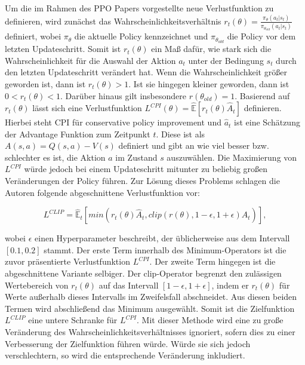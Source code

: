 Um die im Rahmen des PPO Papers vorgestellte neue Verlustfunktion zu definieren, wird zunächst das Wahrscheinlichkeitsverhältnis $r_t(\theta) = \frac{\pi_\theta(a_t|s_t)}{\pi_{\theta_{old}}(a_t|s_t)}$ definiert, wobei $\pi_\theta$ die aktuelle Policy kennzeichnet und $\pi_{\theta_{old}}$ die Policy vor dem letzten Updateschritt. Somit ist $r_t(\theta)$ ein Maß dafür, wie stark sich die Wahrscheinlichkeit für die Auswahl der Aktion $a_t$ unter der Bedingung $s_t$ durch den letzten Updateschritt verändert hat. Wenn die Wahrscheinlichkeit größer geworden ist, dann ist $r_t(\theta) > 1$. Ist sie hingegen kleiner geworden, dann ist $0 < r_t(\theta) < 1$. Darüber hinaus gilt insbesondere $r(\theta_{old}) = 1$. Basierend auf $r_t(\theta)$ lässt sich eine Verlustfunktion $L^{CPI}(\theta) = \hat{\mathbb{E}}[r_t(\theta) \hat{A}_t]$ definieren. Hierbei steht CPI für conservative policy improvement und $\hat{a}_t$ ist eine Schätzung der Advantage Funktion zum Zeitpunkt $t$. Diese ist als $A(s,a) = Q(s,a) - V(s)$ definiert und gibt an wie viel besser bzw. schlechter es ist, die Aktion $a$ im Zustand $s$ auszuwählen. Die Maximierung von $L^{CPI}$ würde jedoch bei einem Updateschritt mitunter zu beliebig großen Veränderungen der Policy führen. Zur Lösung dieses Problems schlagen die Autoren folgende abgeschnittene Verlustfunktion vor:

\begin{equation}
  \label{L_CLIP}
	L^{CLIP} = \hat{\mathbb{E}}_t[min(r_t(\theta) \hat{A}_t, clip(r(\theta), 1-\epsilon, 1+\epsilon) \hat{A}_t)],
\end{equation}

wobei $\epsilon$ einen Hyperparameter beschreibt, der üblicherweise aus dem Intervall $[0.1, 0.2]$ stammt. Der erste Term innerhalb des Minimum-Operators ist die zuvor präsentierte Verlustfunktion $L^{CPI}$. Der zweite Term hingegen ist die abgeschnittene Variante selbiger. Der clip-Operator begrenzt den zulässigen Wertebereich von $r_t(\theta)$ auf das Intervall $[1-\epsilon, 1+\epsilon]$, indem er $r_t(\theta)$ für Werte außerhalb dieses Intervalls im Zweifelsfall abschneidet. Aus diesen beiden Termen wird abschließend das Minimum ausgewählt. Somit ist die Zielfunktion $L^{CLIP}$ eine untere Schranke für $L^{CPI}$. Mit dieser Methode wird eine zu große Veränderung des Wahrscheinlichkeitsverhältnisses ignoriert, sofern dies zu einer Verbesserung der Zielfunktion führen würde. Würde sie sich jedoch verschlechtern, so wird die entsprechende Veränderung inkludiert.

